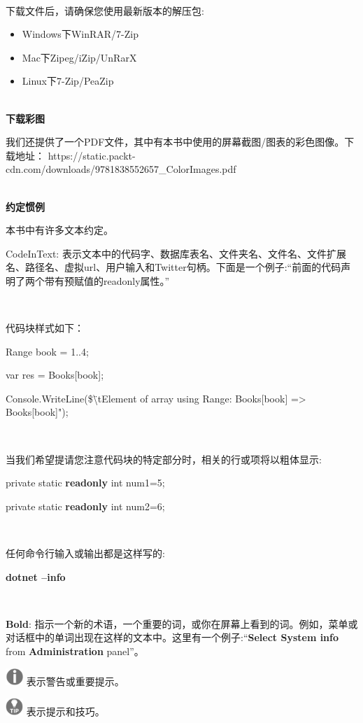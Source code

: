 \noindent\textbf{}\ \par
下载文件后，请确保您使用最新版本的解压包: \par

\begin{itemize}
	\item Windows下WinRAR/7-Zip
	\item Mac下Zipeg/iZip/UnRarX
	\item Linux下7-Zip/PeaZip
\end{itemize}

\hspace*{\fill} \\ %
\noindent\textbf{下载彩图}\ \par
我们还提供了一个PDF文件，其中有本书中使用的屏幕截图/图表的彩色图像。下载地址：
https://static.packt-cdn.com/downloads/9781838552657\_ColorImages.pdf \par

\hspace*{\fill} \\ %
\noindent\textbf{约定惯例}\ \par
本书中有许多文本约定。 \par
\textsf{CodeInText}: 表示文本中的代码字、数据库表名、文件夹名、文件名、文件扩展名、路径名、虚拟url、用户输入和Twitter句柄。下面是一个例子:“前面的代码声明了两个带有预赋值的\textsf{readonly}属性。” \par

\noindent\textbf{}\ \par
\noindent 代码块样式如下： \par
		\textsf{Range book = 1..4}; \par
		\textsf{var res = Books[book];} \par
		\textsf{Console.WriteLine(\$\"\textbackslash tElement of array using Range: Books[{book}] => {Books[book]}");} \par

\noindent\textbf{}\ \par
\noindent 当我们希望提请您注意代码块的特定部分时，相关的行或项将以粗体显示: \par
		\textsf{private static \textbf{readonly} int num1=5;} \par
		\textsf{private static \textbf{readonly} int num2=6;} \par
	
\noindent\textbf{}\ \par
\noindent 任何命令行输入或输出都是这样写的:\par
		\textsf{\textbf{dotnet --info}} \par
		
\noindent\textbf{}\ \par
\textbf{Bold}: 指示一个新的术语，一个重要的词，或你在屏幕上看到的词。例如，菜单或对话框中的单词出现在这样的文本中。这里有一个例子:“\textbf{Select System info} from \textbf{Administration} panel”。
	
\includegraphics[width=0.05\textwidth]{images/warn}
表示警告或重要提示。
	
\includegraphics[width=0.05\textwidth]{images/tip}
表示提示和技巧。
	